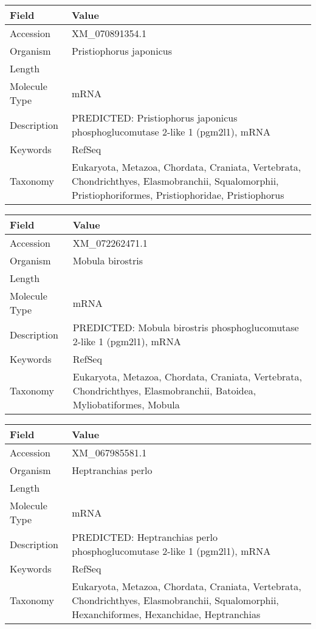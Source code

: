 \documentclass[10pt]{article}
\begin{document}
\vspace{1em}
{\footnotesize
\begin{longtable}{>{\raggedright\arraybackslash}p{4.5cm} >{\raggedright\arraybackslash}p{11.5cm}}
\textbf{Field} & \textbf{Value} \\
\hline
Accession & XM\_070891354.1 \\
Organism & Pristiophorus japonicus \\
Length & 6396 \\
Molecule Type & mRNA \\
Description & PREDICTED: Pristiophorus japonicus phosphoglucomutase 2-like 1 (pgm2l1), mRNA \\
Keywords & RefSeq \\
Taxonomy & Eukaryota, Metazoa, Chordata, Craniata, Vertebrata, Chondrichthyes, Elasmobranchii, Squalomorphii, Pristiophoriformes, Pristiophoridae, Pristiophorus \\
\end{longtable}
}

\vspace{1em}
{\footnotesize
\begin{longtable}{>{\raggedright\arraybackslash}p{4.5cm} >{\raggedright\arraybackslash}p{11.5cm}}
\textbf{Field} & \textbf{Value} \\
\hline
Accession & XM\_072262471.1 \\
Organism & Mobula birostris \\
Length & 5678 \\
Molecule Type & mRNA \\
Description & PREDICTED: Mobula birostris phosphoglucomutase 2-like 1 (pgm2l1), mRNA \\
Keywords & RefSeq \\
Taxonomy & Eukaryota, Metazoa, Chordata, Craniata, Vertebrata, Chondrichthyes, Elasmobranchii, Batoidea, Myliobatiformes, Mobula \\
\end{longtable}
}

\vspace{1em}
{\footnotesize
\begin{longtable}{>{\raggedright\arraybackslash}p{4.5cm} >{\raggedright\arraybackslash}p{11.5cm}}
\textbf{Field} & \textbf{Value} \\
\hline
Accession & XM\_067985581.1 \\
Organism & Heptranchias perlo \\
Length & 6587 \\
Molecule Type & mRNA \\
Description & PREDICTED: Heptranchias perlo phosphoglucomutase 2-like 1 (pgm2l1), mRNA \\
Keywords & RefSeq \\
Taxonomy & Eukaryota, Metazoa, Chordata, Craniata, Vertebrata, Chondrichthyes, Elasmobranchii, Squalomorphii, Hexanchiformes, Hexanchidae, Heptranchias \\
\end{longtable}
}
\end{document}
